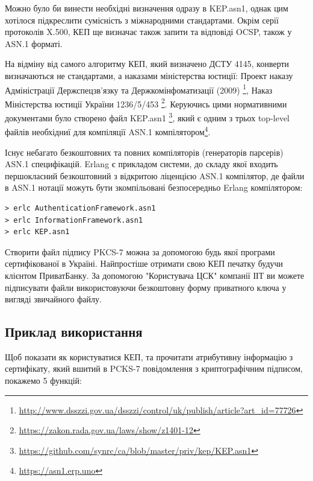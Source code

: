 Можно було би винести необхідні визначення одразу в KEP.asn1,
однак цим хотілося підкреслити сумісність з міжнародними стандартами. Окрім серії
протоколів X.500, КЕП ще визначає також запити та відповіді OCSP, також у ASN.1 форматі.

\newpage
На відміну від самого алгоритму КЕП, який визначено ДСТУ 4145,
конверти визначаються не стандартами, а наказами міністерства юстиції:
Проект наказу Адміністрації Держспецзв'язку та Держкомінфоматизації (2009) \footnote{\url{http://www.dsszzi.gov.ua/dsszzi/control/uk/publish/article?art\_id=77726}},
Наказ Міністерства юстиції України 1236/5/453 \footnote{\url{https://zakon.rada.gov.ua/laws/show/z1401-12}}.
Керуючись цими нормативними документами було створено файл KEP.asn1 \footnote{\url{https://github.com/synrc/ca/blob/master/priv/kep/KEP.asn1}},
який є одним з трьох top-level файлів необхідниї для компіляції ASN.1 компілятором\footnote{\url{https://asn1.erp.uno}}.

Існує небагато безкоштовних та повних компіляторів (генераторів парсерів)
ASN.1 специфікацій. Erlang є прикладом системи, до складу якої входить
першокласний безкоштовний з відкритою ліценцією ASN.1 компілятор, де
файли в ASN.1 нотації можуть бути зкомпільовані безпосередньо Erlang компілятором:

\renewcommand{\footnotesize}{\normalsize}

\begin{verbatim}
> erlc AuthenticationFramework.asn1
> erlc InformationFramework.asn1
> erlc KEP.asn1
\end{verbatim}

Створити файл підпису PKCS-7 можна за допомогою будь якої програми сертифікованої в Україні.
Найпростіше отримати свою КЕП печатку будучи клієнтом ПриватБанку. За допомогою
"Користувача ЦСК" компанії ІІТ ви можете підписувати файли використовуючи безкоштовну
форму приватного ключа у вигляді звичайного файлу.

\newpage
\subsection{Приклад використання}

Щоб показати як користуватися КЕП, та прочитати атрибутивну інформацію з сертифікату,
який вшитий в PCKS-7 повідомлення з криптографічним підписом, покажемо 5 функцій:

\renewcommand{\footnotesize}{\scriptsize}

